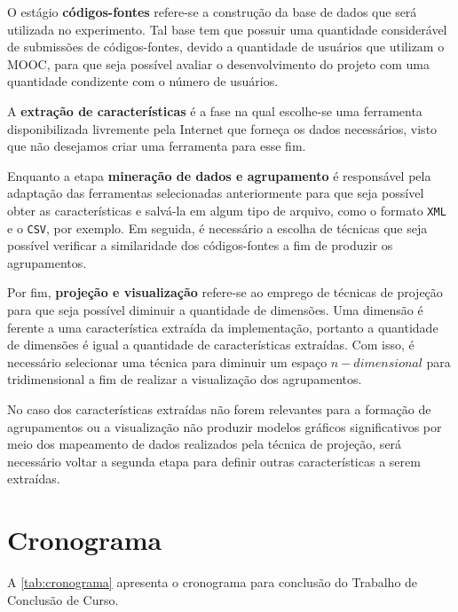 	O estágio \textbf{códigos-fontes} refere-se a construção da base de dados que será
	utilizada no experimento. Tal base tem que possuir uma quantidade considerável de
	submissões de códigos-fontes, devido a quantidade de usuários que utilizam o MOOC,
	para que seja possível avaliar o desenvolvimento do projeto com uma quantidade
	condizente com o número de usuários.
	
	A \textbf{extração de características} é a fase na qual escolhe-se uma ferramenta
	disponibilizada livremente pela Internet que forneça os dados necessários, visto
	que não desejamos criar uma ferramenta para esse fim.

	Enquanto a etapa \textbf{mineração de dados e agrupamento} é responsável pela
	adaptação das ferramentas selecionadas anteriormente para que seja possível obter
	as características e salvá-la em algum tipo de arquivo, como o formato \texttt{XML}
	e o \texttt{CSV}, por exemplo. Em seguida, é necessário a escolha de técnicas que
	seja possível verificar a similaridade dos códigos-fontes a fim de produzir os
	agrupamentos.
	
	Por fim, \textbf{projeção e visualização} refere-se ao emprego de técnicas de
	projeção para que seja possível diminuir a quantidade de dimensões. Uma dimensão
	é ferente a uma característica extraída da implementação, portanto a quantidade
	de dimensões é igual a quantidade de características extraídas. Com isso, é
	necessário selecionar uma técnica para diminuir um espaço $n-dimensional$ para
	tridimensional a fim de realizar a visualização dos agrupamentos.
	
	No caso dos características extraídas não forem relevantes para a formação de
	agrupamentos ou a visualização não produzir modelos gráficos significativos por
	meio dos mapeamento de dados realizados pela técnica de projeção, será necessário
	voltar a segunda etapa para definir outras características a serem extraídas.

	\section{Cronograma}
	
	A \cref{tab:cronograma} apresenta o cronograma para conclusão do Trabalho de
	Conclusão de Curso.
	
